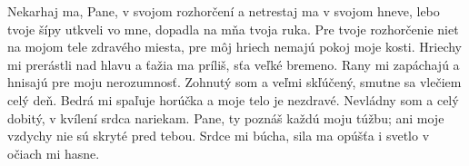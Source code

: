 Nekarhaj ma, Pane, v svojom rozhorčení
a netrestaj ma v svojom hneve,
\versseparator
lebo tvoje šípy utkveli vo mne,
dopadla na mňa tvoja ruka.
\versseparator
Pre tvoje rozhorčenie niet na mojom tele zdravého miesta,
pre môj hriech nemajú pokoj moje kosti.
\versseparator
Hriechy mi prerástli nad hlavu
a ťažia ma príliš, sťa veľké bremeno.
\versseparator
Rany mi zapáchajú a hnisajú
pre moju nerozumnosť.
\versseparator
Zohnutý som a veľmi skľúčený,
smutne sa vlečiem celý deň.
\versseparator
Bedrá mi spaľuje horúčka
a moje telo je nezdravé.
\versseparator
Nevládny som a celý dobitý,
v kvílení srdca nariekam.
\versseparator
Pane, ty poznáš každú moju túžbu;
ani moje vzdychy nie sú skryté pred tebou.
\versseparator
Srdce mi búcha, sila ma opúšťa
i svetlo v očiach mi hasne.
